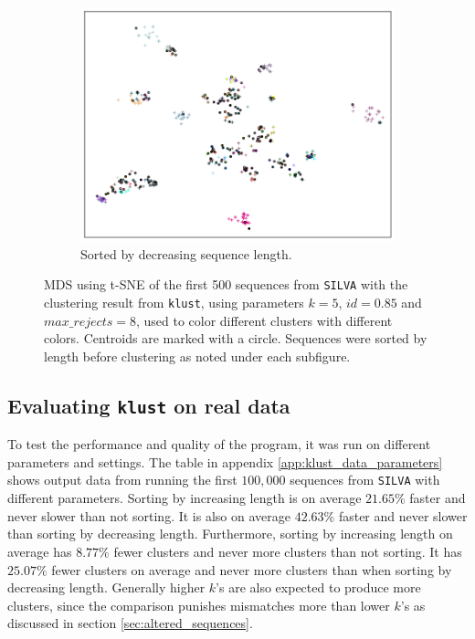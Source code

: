 \clearpage
\begin{figure}[H]
  \ContinuedFloat
  \begin{subfigure}[b]{1.0\textwidth}
    \includegraphics[width=1.0\textwidth]{graphics/SILVA_t-SNE_decr_sort_500.png}
    \caption{Sorted by decreasing sequence length.}
    \label{fig:mds_silva_sort_decr}
  \end{subfigure}
  \caption{MDS using t-SNE of the first 500 sequences from \texttt{SILVA} with
    the clustering result from \texttt{klust}, using parameters $k=5$,
    $id=0.85$ and $max\_rejects=8$, used to color different clusters with
    different colors. Centroids are marked with a circle. Sequences were sorted
    by length before clustering as noted under each subfigure.}
  \label{fig:mds_silva}
\end{figure}



\subsection{Evaluating \texttt{klust} on real data}

To test the performance and quality of the program, it was run on different
parameters and settings. The table in appendix \ref{app:klust_data_parameters}
shows output data from running the first $100,000$ sequences from
\texttt{SILVA} with different parameters. Sorting by increasing length is on
average $21.65\%$ faster and never slower than not sorting. It is also on
average $42.63\%$ faster and never slower than sorting by decreasing length.
Furthermore, sorting by increasing length on average has $8.77\%$ fewer
clusters and never more clusters than not sorting. It has $25.07\%$ fewer
clusters on average and never more clusters than when sorting by decreasing
length. Generally higher $k$'s are also expected to produce more clusters,
since the comparison punishes mismatches more than lower $k$'s as discussed in
section \ref{sec:altered_sequences}.

